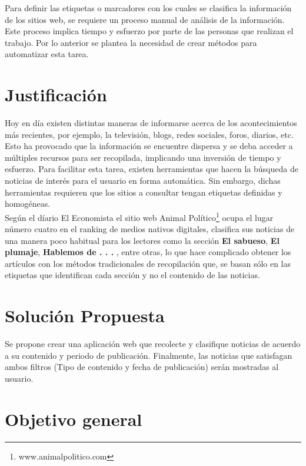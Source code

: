 Para definir las etiquetas o marcadores con los cuales se clasifica la información de los sitios web, se requiere un proceso manual de análisis de 
la información. Este proceso implica tiempo y esfuerzo por parte de las personas que realizan el trabajo. Por lo anterior se plantea la necesidad de crear 
métodos para automatizar esta tarea. 

\section{Justificación}


Hoy en día existen distintas maneras de informarse acerca de los acontecimientos más recientes, por ejemplo, la televisión, blogs, redes sociales, foros,
diarios, etc. Esto ha provocado que la información se encuentre dispersa y
se deba acceder a múltiples recursos para ser recopilada, implicando
una inversión de tiempo y esfuerzo. Para facilitar esta tarea, existen herramientas
que hacen la búsqueda de noticias de interés para el usuario en forma automática. Sin embargo, dichas herramientas requieren que los sitios a consultar 
tengan etiquetas definidas y homogéneas.\\

Según el díario El Economista \citep{CU3} el sitio web Animal Político\footnote{www.animalpolitico.com}
ocupa el lugar número cuatro en el ranking de medios nativos digitales, clasifica sus noticias de una manera poco habitual para los lectores como la sección
\textbf{El sabueso}, \textbf{El plumaje}, \textbf{Hablemos de . . . }, entre otras, lo que hace complicado obtener los artículos con los métodos tradicionales 
de recopilación que, se basan sólo en las etiquetas que identifican cada sección y no el contenido de las noticias.


\section{Solución Propuesta}

Se propone crear una aplicación web que recolecte y clasifique noticias de acuerdo a su contenido y periodo de publicación. Finalmente, las noticias
que satisfagan ambos filtros (Tipo de contenido y fecha de publicación) serán mostradas al usuario.

\section{Objetivo general}

